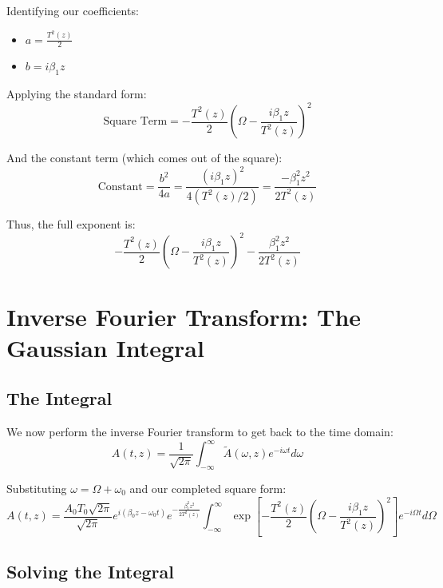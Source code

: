 \documentclass[12pt]{article}
\begin{document}
Identifying our coefficients:
\begin{itemize}
    \item $a = \frac{T^2(z)}{2}$
    \item $b = i\beta_1 z$
\end{itemize}

Applying the standard form:
\begin{equation}
\text{Square Term} = -\frac{T^2(z)}{2}\left(\Omega - \frac{i\beta_1 z}{T^2(z)}\right)^2
\end{equation}

And the constant term (which comes out of the square):
\begin{equation}
\text{Constant} = \frac{b^2}{4a} = \frac{(i\beta_1 z)^2}{4(T^2(z)/2)} = \frac{-\beta_1^2 z^2}{2T^2(z)}
\end{equation}

Thus, the full exponent is:
\begin{equation}
-\frac{T^2(z)}{2}\left(\Omega - \frac{i\beta_1 z}{T^2(z)}\right)^2 - \frac{\beta_1^2 z^2}{2T^2(z)}
\end{equation}

\section{Inverse Fourier Transform: The Gaussian Integral}

\subsection{The Integral}

We now perform the inverse Fourier transform to get back to the time domain:
\begin{equation}
A(t, z) = \frac{1}{\sqrt{2\pi}} \int_{-\infty}^\infty \tilde{A}(\omega, z) e^{-i\omega t} d\omega
\end{equation}

Substituting $\omega = \Omega + \omega_0$ and our completed square form:
\begin{equation}
A(t, z) = \frac{A_0 T_0 \sqrt{2\pi}}{\sqrt{2\pi}} e^{i(\beta_0 z - \omega_0 t)} e^{-\frac{\beta_1^2 z^2}{2T^2(z)}} \int_{-\infty}^\infty \exp\left[-\frac{T^2(z)}{2}\left(\Omega - \frac{i\beta_1 z}{T^2(z)}\right)^2\right] e^{-i\Omega t} d\Omega
\end{equation}

\subsection{Solving the Integral}
\end{document}
